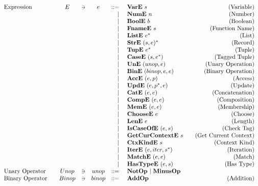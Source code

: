 \begin{align*}
\begin{array}{lcccrlr}
%
  \text{Expression}\quad& E &\ni& e &::=& ~ \vare ~ s &\quad\text{(Variable)} \\
    &&&& | & ~ \nume ~ n &\quad\text{(Number)} \\
    &&&& | & ~ \boole ~ b &\quad\text{(Boolean)} \\
    &&&& | & ~ \fnamee ~ s &\quad\text{(Function Name)} \\
    &&&& | & ~ \liste ~ \seq e &\quad\text{(List)} \\
    &&&& | & ~ \stre ~ \seq{(s, e)} &\quad\text{(Record)} \\
    &&&& | & ~ \tupe ~ \seq e &\quad\text{(Tuple)} \\
    &&&& | & ~ \casee ~ (s, \seq e) &\quad\text{(Tagged Tuple)} \\
    &&&& | & ~ \une ~ (unop, e) &\quad\text{(Unary Operation)} \\
    &&&& | & ~ \bine ~ (binop, e, e) &\quad\text{(Binary Operation)} \\
    &&&& | & ~ \acce ~ (e, p) &\quad\text{(Access)} \\
    &&&& | & ~ \upde ~ (e, \seq{p}, e) &\quad\text{(Update)} \\
    &&&& | & ~ \cate ~ (e, e) &\quad\text{(Concatenation)} \\
    &&&& | & ~ \compe ~ (e, e) &\quad\text{(Composition)} \\
    &&&& | & ~ \meme ~ (e, e) &\quad\text{(Membership)} \\
    &&&& | & ~ \choosee ~ e &\quad\text{(Choose)} \\
    &&&& | & ~ \lene ~ e &\quad\text{(Length)} \\
    &&&& | & ~ \iscaseofe ~ (e, s) &\quad\text{(Check Tag)} \\
    &&&& | & ~ \getcurctxe ~ s &\quad\text{(Get Current Context)} \\
    &&&& | & ~ \ctxkinde ~ s &\quad\text{(Context Kind)} \\
    &&&& | & ~ \itere ~ (e, iter, \seq{s}) &\quad\text{(Iteration)} \\
    &&&& | & ~ \matche ~ (e, e) &\quad\text{(Match)} \\
    &&&& | & ~ \hastypee ~ (e, s) &\quad\text{(Has Type)} \\
%
  \text{Unary Operator}\quad& Unop &\ni& unop &::=& ~ \notop ~ | ~ \minusop \\
  \text{Binary Operator}\quad& Binop &\ni& binop &::=& ~ \addop &\quad\text{(Addition)} \\

\end{array}
\end{align*}
